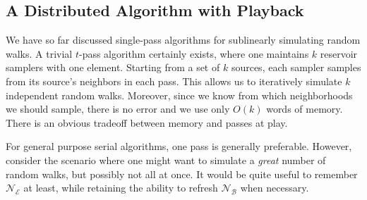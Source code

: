 \documentclass{report}
\begin{document}
%
%



\subsection{A Distributed Algorithm with Playback}
 \label{walks:sec:walks:distributed:playback}

We have so far discussed single-pass algorithms for sublinearly simulating random walks. 
A trivial $t$-pass algorithm certainly exists, where one maintains $k$ reservoir samplers  with one element. 
Starting from a set of $k$ sources, each sampler samples from its source's neighbors in each pass. 
This allows us to iteratively simulate $k$ independent random walks. 
Moreover, since we know from which neighborhoods we should sample, there is no error and we use only $O(k)$ words of memory.
There is an obvious tradeoff between memory and passes at play.

For general purpose serial algorithms, one pass is generally preferable.
However, consider the scenario where one might want to simulate a \emph{great} number of random walks, but possibly not all at once.
It would be quite useful to remember $\mathcal{N}_\mathcal{E}$ at least, while retaining the ability to refresh $\mathcal{N}_\mathcal{B}$ when necessary.
\end{document}
